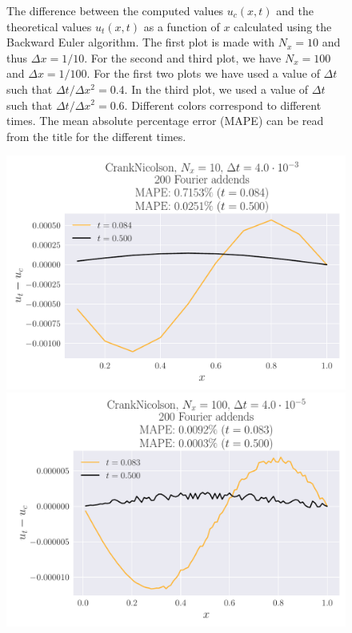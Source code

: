 \documentclass[reprint, english,notitlepage,nofootinbib]{revtex4-1}  %
\begin{document}
\begin{figure}
  \caption{The difference between the computed values \(u_c(x, t)\) and the theoretical values \(u_t(x, t)\) as a function of \(x\) calculated using the Backward Euler algorithm. The first plot is made with \(N_x = 10\) and thus \(\Delta x = 1/10\). For the second and third plot, we have \(N_x = 100\) and \(\Delta x = 1/100\). For the first two plots we have used a value of \(\Delta t\) such that \(\Delta t / \Delta x^2 = 0.4\). In the third plot, we used a value of \(\Delta t\) such that \(\Delta t / \Delta x^2 = 0.6\). Different colors correspond to different times. The mean absolute percentage error (MAPE) can be read from the title for the different times.}
  \label{fig:BackwardEuler}
\end{figure}
\begin{figure}
  \includegraphics[width=\linewidth]{CrankNicolson-Nt125-dt4_0e-03-Nx10-Error.pdf}
  \includegraphics[width=\linewidth]{CrankNicolson-Nt12499-dt4_0e-05-Nx100-Error.pdf}

\end{figure}
\end{document}
